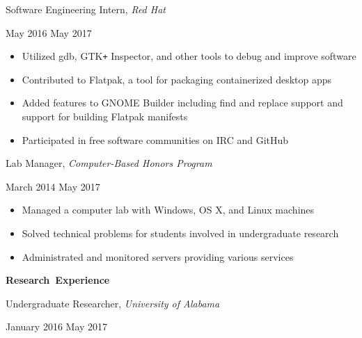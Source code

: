 \documentclass[11pt]{article}
\begin{document}
\begin{minipage}[t]{0.65\textwidth}
\flushleft
Software Engineering Intern, \textit{Red Hat}\\
\end{minipage}
\begin{minipage}[t]{0.30\textwidth}
\flushright
May 2016 \space \textemdash \space May 2017\\
\end{minipage}

\begin{itemize}
  \item Utilized gdb, GTK\texttt{+} Inspector, and other tools to debug and improve software
  \item Contributed to Flatpak, a tool for packaging containerized desktop apps
  \item Added features to GNOME Builder including find and replace support and support for building Flatpak manifests
  \item Participated in free software communities on IRC and GitHub
\end{itemize}

\begin{minipage}[t]{0.65\textwidth}
\flushleft
Lab Manager, \textit{Computer-Based Honors Program}\\
\end{minipage}
\begin{minipage}[t]{0.30\textwidth}
\flushright
March 2014 \space \textemdash \space May 2017\\
\end{minipage}

\begin{itemize}
  \item Managed a computer lab with Windows, OS X, and Linux machines
  \item Solved technical problems for students involved in undergraduate research
  \item Administrated and monitored servers providing various services
\end{itemize}

\vspace{0.8em}
\hbox{\large \textbf{Research Experience}}

\vspace{0.4em}
\begin{minipage}[t]{0.65\textwidth}
\flushleft
Undergraduate Researcher, \textit{University of Alabama}\\
\end{minipage}
\begin{minipage}[t]{0.30\textwidth}
\flushright
January 2016 \space \textemdash \space May 2017\\
\end{minipage}
\end{document}

